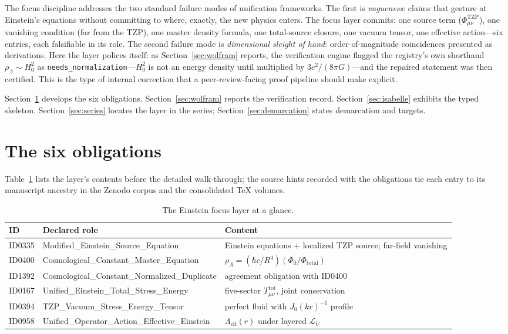 \documentclass[11pt]{article}
\theoremstyle{remark}
\begin{document}
The focus discipline addresses the two standard failure modes of unification frameworks. The first is \emph{vagueness}: claims that gesture at Einstein's equations without committing to where, exactly, the new physics enters. The focus layer commits: one source term ($\Phi^{\mathrm{TZP}}_{\mu\nu}$), one vanishing condition (far from the TZP), one master density formula, one total-source closure, one vacuum tensor, one effective action---six entries, each falsifiable in its role. The second failure mode is \emph{dimensional sleight of hand}: order-of-magnitude coincidences presented as derivations. Here the layer polices itself: as Section~\ref{sec:wolfram} reports, the verification engine flagged the registry's own shorthand $\rho_\Lambda \sim H_0^2$ as \texttt{needs\_normalization}---$H_0^2$ is not an energy density until multiplied by $3c^2/(8\pi G)$---and the repaired statement was then certified. This is the type of internal correction that a peer-review-facing proof pipeline should make explicit.

Section~\ref{sec:obligations} develops the six obligations. Section~\ref{sec:wolfram} reports the verification record. Section~\ref{sec:isabelle} exhibits the typed skeleton. Section~\ref{sec:series} locates the layer in the series; Section~\ref{sec:demarcation} states demarcation and targets.

\section{The six obligations}
\label{sec:obligations}

Table~\ref{tab:roles} lists the layer's contents before the detailed walk-through; the source hints recorded with the obligations tie each entry to its manuscript ancestry in the Zenodo corpus and the consolidated TeX volumes.

\begin{table}[H]
\centering
\small
\caption{The Einstein focus layer at a glance.}
\label{tab:roles}
\begin{tabular}{llp{6.8cm}}
\toprule
ID & Declared role & Content \\
\midrule
ID0335 & Modified\_Einstein\_Source\_Equation & Einstein equations + localized TZP source; far-field vanishing \\
ID0400 & Cosmological\_Constant\_Master\_Equation & $\rho_\Lambda = (\hbar c/R^4)(\Phi_0/\Phi_{\mathrm{total}})$ \\
ID1392 & Cosmological\_Constant\_Normalized\_Duplicate & agreement obligation with ID0400 \\
ID0167 & Unified\_Einstein\_Total\_Stress\_Energy & five-sector $T^{\mathrm{tot}}_{\mu\nu}$, joint conservation \\
ID0394 & TZP\_Vacuum\_Stress\_Energy\_Tensor & perfect fluid with $J_0(kr)^{-1}$ profile \\
ID0958 & Unified\_Operator\_Action\_Effective\_Einstein & $\Lambda_{\mathrm{eff}}(r)$ under layered $\mathcal{L}_U$ \\
\bottomrule
\end{tabular}
\end{table}
\end{document}
